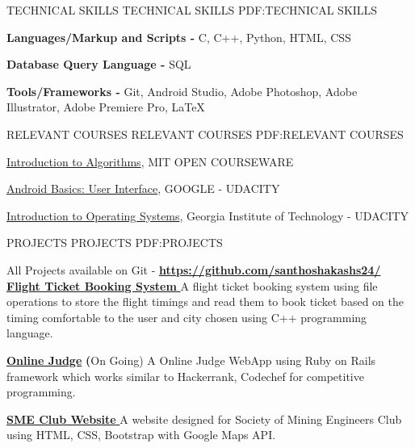 \documentclass[letterpaper,MMMyyyy,nonstopmode]{simpleresumecv}
\begin{document}
\begin{Body}
\begin{Detail}
\Section
{TECHNICAL
SKILLS}
{TECHNICAL SKILLS}
{PDF:TECHNICAL SKILLS}

\Entry
{\textbf{Languages/Markup and Scripts -}}
C, C++, Python, HTML, CSS

\Entry
{\textbf{Database Query Language -}}
SQL

\Entry
{\textbf{Tools/Frameworks -}}
Git, Android Studio, Adobe Photoshop, Adobe Illustrator, Adobe Premiere Pro, \LaTeX\


\Section
{RELEVANT
COURSES}
{RELEVANT COURSES}
{PDF:RELEVANT COURSES}


\href{https://ocw.mit.edu/courses/electrical-engineering-and-computer-science/6-046j-introduction-to-algorithms-sma-5503-fall-2005/index.htm}
{Introduction to Algorithms},
MIT OPEN COURSEWARE
\hfill

\href{https://classroom.udacity.com/courses/ud834}
{Android Basics: User Interface},
GOOGLE - UDACITY

\href{https://classroom.udacity.com/courses/ud834}
{Introduction to Operating Systems},
Georgia Institute of Technology - UDACITY

\Gap

\end{Detail}


\Section
{PROJECTS}
{PROJECTS}
{PDF:PROJECTS}

All Projects available on Git -
\href{https://github.com/santhoshakashs24/}
{\color{blue} \textbf{https://github.com/santhoshakashs24/ }}
\Gap
\Entry
\BulletItem
\href{https://github.com/santhoshakashs24/Flight-Booking-System-for-KIAL}
{\color{blue} \textbf{Flight Ticket Booking System }}
\SubBulletItem
A flight ticket booking system using file operations to store the flight timings and read them to book ticket based on the timing comfortable to the user and city chosen using C++ programming language. 

\Entry
\BulletItem
\href{https://github.com/santhoshakashs24/IE-Online-Judge}
{\color{blue} \textbf{Online Judge}}
{\textbf(On Going)}
\SubBulletItem
A Online Judge WebApp using Ruby on Rails framework which works similar to Hackerrank, Codechef for competitive programming.

\Entry
\BulletItem
\href{https://github.com/santhoshakashs24/SME-NITK}
{\color{blue} \color{blue}\textbf{SME Club Website }}
\SubBulletItem
A website designed for Society of Mining Engineers Club using HTML, CSS, Bootstrap with Google Maps API.


\end{Body}
\end{document}
